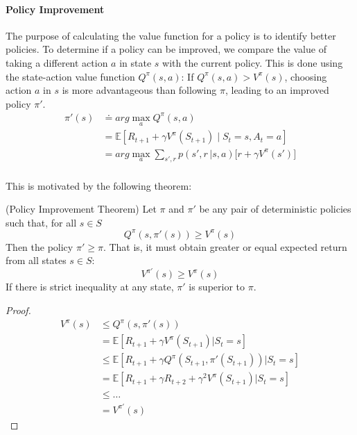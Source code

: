 \paragraph{Policy Improvement} 
The purpose of calculating the value function for a policy is to identify better policies. 
To determine if a policy can be improved, we 
compare the value of taking a different action \( a \) in state \( s \) with the current policy. 
This is done using the state-action value function \( Q^\pi(s, a) \):
If $Q^\pi(s, a) > V^\pi(s)$, choosing action $a$ in $s$ is more advantageous than following $\pi$, 
leading to an improved policy $\pi'$. 
\begin{align}
    \pi'(s) & \doteq arg\max_a Q^\pi(s,a) \nonumber\\
    &=  \mathbb{E}[R_{t+1}+\gamma V^{\pi}(S_{t+1})\mid S_t=s,A_t=a] \nonumber\\
    &= arg\max _a \sum_{s', r} p(s',r\,|s,a)\Big[r+\gamma V^{\pi}(s')\Big] \nonumber\\
    \label{eq:policy-improvement}
\end{align}

This is motivated by the following theorem:
\begin{theorem}
    (Policy Improvement Theorem) Let $\pi$ and $\pi'$ be any pair of deterministic policies such that, 
    for all $s \in S$ 
    $$Q^\pi(s, \pi'(s)) \geq V^\pi(s)$$
    Then the policy $\pi' \geq \pi$. That is, it must obtain greater 
    or equal expected return from all states $s \in S$:
    $$V^{\pi'}(s) \geq V^\pi(s)$$
    If there is strict inequality at any state, $\pi'$ is superior to $\pi$.
    \label{th:policy-improvement}
\end{theorem}
\begin{proof}
    \begin{align}
        V^{\pi}(s) &\leq Q^{\pi}(s, \pi'(s)) \nonumber \\
        &= \mathbb{E}\left[R_{t+1} + \gamma V^{\pi}(S_{t+1}) | S_t = s\right] \nonumber \\
        &\leq \mathbb{E}\left[R_{t+1} +\gamma Q^{\pi}(S_{t+1}, \pi'(S_{t+1})) | S_t = s\right] \nonumber \\
        &= \mathbb{E}\left[R_{t+1} + \gamma R_{t+2} + \gamma ^2 V^{\pi}(S_{t+1}) | S_t = s\right] \nonumber \\
        &\leq \dots \nonumber \\
        &=V^{\pi'}(s) \nonumber
    \end{align}
\end{proof}

